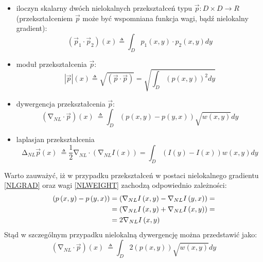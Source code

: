 \documentclass[12pt, twoside, openany]{report}
\theoremstyle{definition}
\begin{document}
\begin{itemize}
\item
iloczyn skalarny dwóch nielokalnych przekształceń typu $\overrightarrow{p}:D \times D \longrightarrow R$ (przekształceniem $\overrightarrow{p}$ może być wspomniana funkcja wagi, bądź nielokalny gradient):
\begin{equation}
\left({\overrightarrow{p}}_1\cdot {\overrightarrow{p}}_2\right)(x)\triangleq \int_D{p_1(x,y)\cdot p_2\left(x,y\right)dy}
\label{NLPRODUCT}
\end{equation}
\item
moduł przekształcenia $\overrightarrow{p}$:
\begin{equation}
\left|\overrightarrow{p}\right|\left(x\right)\triangleq \sqrt{(\overrightarrow{p}\cdot \overrightarrow{p})}=\sqrt{\int_D{{\left(p\left(x,y\right)\right)}^2dy}} 
\label{NLMOD}
\end{equation}
\item
dywergencja przekształcenia $\overrightarrow{p}$:
\begin{equation}
({\mathrm{\nabla }}_{NL}\cdot \overrightarrow{p})(x)\ \triangleq \int_D{\left(p\left(x,y\right)-p\left(y,x\right)\right)\sqrt{w(x,y)}dy}
\label{NLDIV}
\end{equation}
\item
laplasjan przekształcenia
\begin{equation}
{\mathrm{\Delta }}_{NL}\overrightarrow{p}(x)\ \triangleq \frac{1}{2}{\mathrm{\nabla }}_{NL}\cdot \left({\mathrm{\nabla }}_{NL}I\left(x\right)\right)=\int_D{\left(I\left(y\right)-I\left(x\right)\right)w(x,y)dy}
\label{NLLAP}
\end{equation}
\end{itemize}
Warto zauważyć, iż w przypadku przekształceń w postaci nielokalnego gradientu \eqref{NLGRAD} oraz wagi \eqref{NLWEIGHT} zachodzą odpowiednio zależności:
\begin{align}
\left(p\left(x,y\right)-p\left(y,x\right)\right) &= \left({\mathrm{\nabla }}_{NL}I\left(x,y\right)-{\mathrm{\nabla }}_{NL}I\left(y,x\right)\right)  \notag =\\ 
&= \left({\mathrm{\nabla }}_{NL}I\left(x,y\right)+{\mathrm{\nabla }}_{NL}I\left(x,y\right)\right) \notag =\\
&=2{\mathrm{\nabla }}_{NL}I\left(x,y\right)\
\label{NLPOM}
\end{align}
Stąd w szczególnym przypadku nielokalną dywergencję można przedstawić jako: 
\begin{equation}
({\mathrm{\nabla }}_{NL}\cdot \overrightarrow{p})(x)\ \triangleq \int_D{2\left(p\left(x,y\right)\right)\sqrt{w(x,y)}dy}
\label{NLDIVSMART}
\end{equation}
\end{document}
